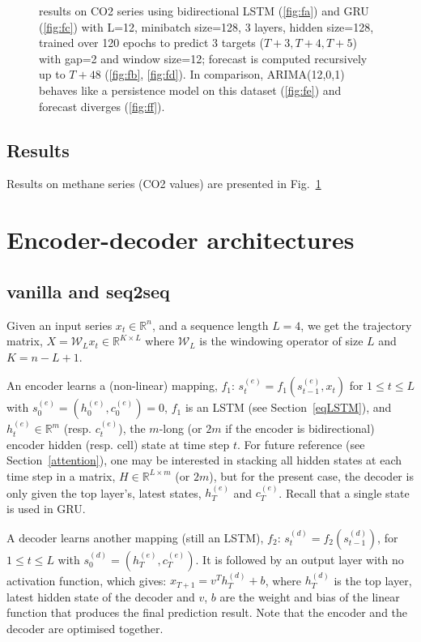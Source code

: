 \documentclass{article}
\begin{document}
\begin{figure}
  \caption{results on CO2 series using bidirectional LSTM (\ref{fig:fa}) and GRU (\ref{fig:fc}) with L=12, minibatch size=128, 3 layers, hidden size=128, trained over 120 epochs to predict 3 targets ($T+3, T+4, T+5$) with gap=2 and window size=12; forecast is computed recursively up to $T+48$ (\ref{fig:fb}, \ref{fig:fd}). In comparison, ARIMA(12,0,1) behaves like a persistence model on this dataset (\ref{fig:fe}) and forecast diverges (\ref{fig:ff}).}
  \label{fig:fig1}
\end{figure}



\subsection{Results}

Results on methane series (CO2 values) are presented in Fig.~\ref{fig:fig1}

\section{Encoder-decoder architectures}

\subsection{vanilla and seq2seq}
Given an input series $x_t \in \mathbb{R}^n$, and a sequence length $L=4$, we get the trajectory matrix, $X=\mathcal{W}_{L}x_t \in \mathbb{R}^{K\times L}$ where $\mathcal{W}_L$ is the windowing operator of size $L$ and $K=n-L+1$.

An encoder learns a (non-linear) mapping, $f_1$: $s^{(e)}_t=f_1(s^{(e)}_{t-1}, x_t)$ for $1 \leq t \leq L$ with $s^{(e)}_0=(h^{(e)}_0, c^{(e)}_0)=0$, $f_1$ is an LSTM (see Section~\ref{eqLSTM}), and $h^{(e)}_t\in \mathbb{R}^{m}$ (resp. $c^{(e)}_t$), the $m$-long (or $2m$ if the encoder is bidirectional) encoder hidden (resp. cell) state at time step $t$. For future reference (see Section~\ref{attention}), one may be interested in stacking all hidden states at each time step in a matrix, $H\in \mathbb{R}^{L\times m}$ (or $2m$), but for the present case, the decoder is only given the top layer's, latest states, $h^{(e)}_T$ and $c^{(e)}_T$. Recall that a single state is used in GRU.

A decoder learns another mapping (still an LSTM), $f_2$: $s^{(d)}_t=f_2(s^{(d)}_{t-1})$, for $1 \leq t\leq L$ with $s^{(d)}_0=(h^{(e)}_T, c^{(e)}_T)$. It is followed by an output layer with no activation function, which gives: $x_{T+1}=v^T h^{(d)}_T + b$, where $h^{(d)}_T$ is the top layer, latest hidden state of the decoder and $v$, $b$ are the weight and bias of the linear function that produces the final prediction result. Note that the encoder and the decoder are optimised together.
\end{document}
